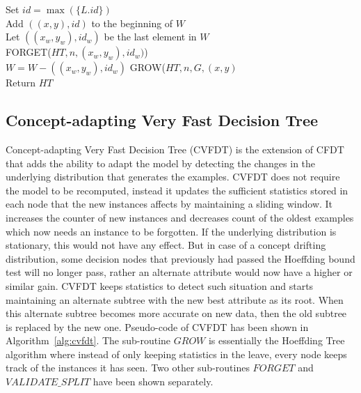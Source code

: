 \begin{algorithm}[htbp]
{{            Set $id = \max(\{L.id\})$ \\
            Add $((x, y), id)$ to the beginning of $W$ \\
             {
                Let $((x_w, y_w), id_w)$ be the last element in $W$ \\
                FORGET($HT, n, (x_w, y_w), id_w)$) \label{algln:cvfdt:forget} \\
                $W = W - ((x_w, y_w), id_w)$
            }
            GROW($HT, n, G, (x,y)$ \\
        }
        Return $HT$
    }
\end{algorithm}
\subsection{Concept-adapting Very Fast Decision Tree}
Concept-adapting Very Fast Decision Tree (CVFDT) is the extension of CFDT that adds the ability to adapt the model by detecting the changes in the underlying distribution that generates the examples. CVFDT does not require the model to be recomputed, instead it updates the sufficient statistics stored in each node that the new instances affects by maintaining a sliding window. It increases the counter of new instances and decreases count of the oldest examples which now needs an instance to be forgotten. If the underlying distribution is stationary, this would not have any effect. But in case of a concept drifting distribution, some decision nodes that previously had passed the Hoeffding bound test will no longer pass, rather an alternate attribute would now have a higher or similar gain. CVFDT keeps statistics to detect such situation and starts maintaining an alternate subtree with the new best attribute as its root. When this alternate subtree becomes more accurate on new data, then the old subtree is replaced by the new one. Pseudo-code of CVFDT has been shown in Algorithm~\ref{alg:cvfdt}. The sub-routine $GROW$ is essentially the Hoeffding Tree algorithm where instead of only keeping statistics in the leave, every node keeps track of the instances it has seen. Two other sub-routines $FORGET$ and $VALIDATE\_SPLIT$ have been shown separately.

